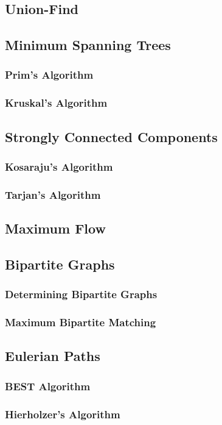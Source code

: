 \subsection{Union-Find}
\subsection{Minimum Spanning Trees}
\subsubsection{Prim's Algorithm}
\subsubsection{Kruskal's Algorithm}
\subsection{Strongly Connected Components}
\subsubsection{Kosaraju's Algorithm}
\subsubsection{Tarjan's Algorithm}
\subsection{Maximum Flow}
\subsection{Bipartite Graphs}
\subsubsection{Determining Bipartite Graphs}
\subsubsection{Maximum Bipartite Matching}
\subsection{Eulerian Paths}
\subsubsection{BEST Algorithm}
\subsubsection{Hierholzer's Algorithm}
